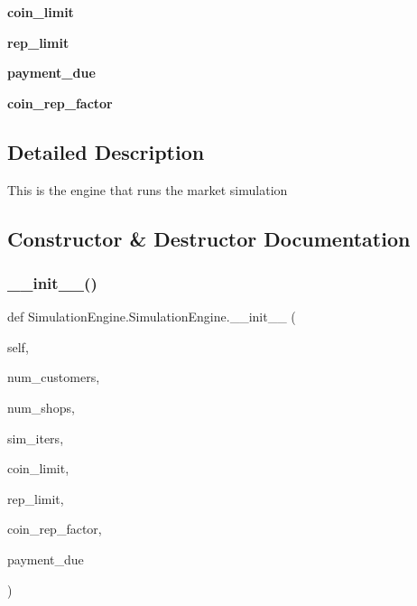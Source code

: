 \begin{DoxyCompactItemize}
\item 
\mbox{\label{class_simulation_engine_1_1_simulation_engine_ab58c9ea0ed901c6e224272f56f904ced}} 
{\bfseries coin\+\_\+limit}
\item 
\mbox{\label{class_simulation_engine_1_1_simulation_engine_ac9670ebfef048cce57e6f6390c8d416f}} 
{\bfseries rep\+\_\+limit}
\item 
\mbox{\label{class_simulation_engine_1_1_simulation_engine_a187c2292dd5d87dd7ea606537150cc1f}} 
{\bfseries payment\+\_\+due}
\item 
\mbox{\label{class_simulation_engine_1_1_simulation_engine_a32c23fec3a8437741542742f0e63d53b}} 
{\bfseries coin\+\_\+rep\+\_\+factor}
\end{DoxyCompactItemize}


\subsection{Detailed Description}
\begin{DoxyVerb}This is the engine that runs the market simulation
\end{DoxyVerb}
 

\subsection{Constructor \& Destructor Documentation}
\mbox{\label{class_simulation_engine_1_1_simulation_engine_adc5d57358f9043ec19d957d6df7afa6e}} 
\subsubsection{\texorpdfstring{\+\_\+\+\_\+init\+\_\+\+\_\+()}{\_\_init\_\_()}}
{\footnotesize\ttfamily def Simulation\+Engine.\+Simulation\+Engine.\+\_\+\+\_\+init\+\_\+\+\_\+ (\begin{DoxyParamCaption}\item[{}]{self,  }\item[{}]{num\+\_\+customers,  }\item[{}]{num\+\_\+shops,  }\item[{}]{sim\+\_\+iters,  }\item[{}]{coin\+\_\+limit,  }\item[{}]{rep\+\_\+limit,  }\item[{}]{coin\+\_\+rep\+\_\+factor,  }\item[{}]{payment\+\_\+due }\end{DoxyParamCaption})}

